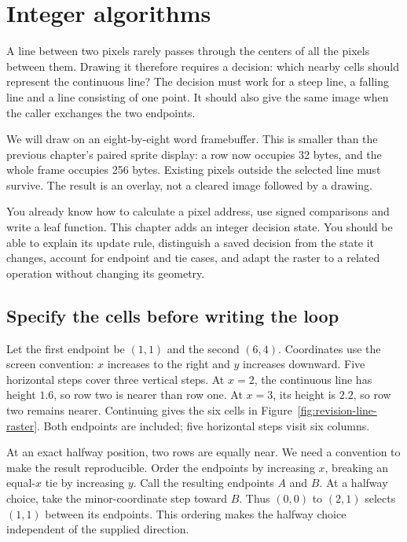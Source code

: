 \chapter{Integer algorithms}
\label{revision:integer-algorithms}

A line between two pixels rarely passes through the centers of all the pixels
between them. Drawing it therefore requires a decision: which nearby cells should
represent the continuous line? The decision must work for a steep line, a falling
line and a line consisting of one point. It should also give the same image when
the caller exchanges the two endpoints.

We will draw on an eight-by-eight word framebuffer. This is smaller than the
previous chapter's paired sprite display: a row now occupies 32 bytes, and the
whole frame occupies 256 bytes. Existing pixels outside the selected line must
survive. The result is an overlay, not a cleared image followed by a drawing.

You already know how to calculate a pixel address, use signed comparisons and
write a leaf function. This chapter adds an integer decision state. You should be
able to explain its update rule, distinguish a saved decision from the state it
changes, account for endpoint and tie cases, and adapt the raster to a related
operation without changing its geometry.

\section{Specify the cells before writing the loop}

Let the first endpoint be $(1,1)$ and the second $(6,4)$. Coordinates use the screen
convention: $x$ increases to the right and $y$ increases downward. Five horizontal
steps cover three vertical steps. At $x=2$, the continuous line has height $1.6$,
so row two is nearer than row one. At $x=3$, its height is $2.2$, so row two remains
nearer. Continuing gives the six cells in Figure~\ref{fig:revision-line-raster}.
Both endpoints are included; five horizontal steps visit six columns.



At an exact halfway position, two rows are equally near. We need a convention to
make the result reproducible. Order the endpoints by increasing $x$, breaking an
equal-$x$ tie by increasing $y$. Call the resulting endpoints $A$ and $B$. At a
halfway choice, take the minor-coordinate step toward $B$. Thus $(0,0)$ to $(2,1)$
selects $(1,1)$ between its endpoints. This ordering makes the halfway choice independent of the supplied direction.

